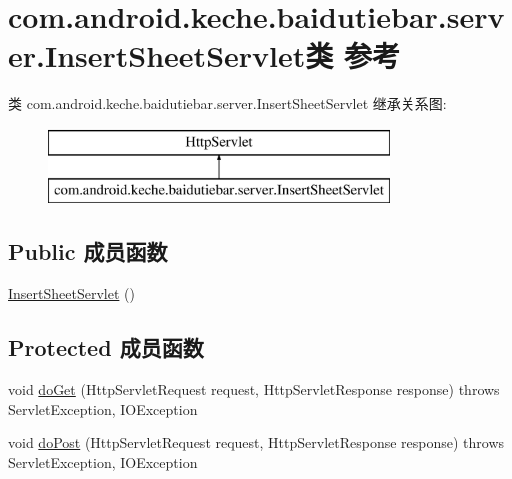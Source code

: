 \hypertarget{classcom_1_1android_1_1keche_1_1baidutiebar_1_1server_1_1_insert_sheet_servlet}{}\section{com.\+android.\+keche.\+baidutiebar.\+server.\+Insert\+Sheet\+Servlet类 参考}
\label{classcom_1_1android_1_1keche_1_1baidutiebar_1_1server_1_1_insert_sheet_servlet}
类 com.\+android.\+keche.\+baidutiebar.\+server.\+Insert\+Sheet\+Servlet 继承关系图\+:\begin{figure}[H]
\begin{center}
\leavevmode
\includegraphics[height=2.000000cm]{classcom_1_1android_1_1keche_1_1baidutiebar_1_1server_1_1_insert_sheet_servlet}
\end{center}
\end{figure}
\subsection*{Public 成员函数}
\begin{DoxyCompactItemize}
\item 
\mbox{\hyperlink{classcom_1_1android_1_1keche_1_1baidutiebar_1_1server_1_1_insert_sheet_servlet_a948ff760e2d129d00a6420a48411d1df}{Insert\+Sheet\+Servlet}} ()
\end{DoxyCompactItemize}
\subsection*{Protected 成员函数}
\begin{DoxyCompactItemize}
\item 
void \mbox{\hyperlink{classcom_1_1android_1_1keche_1_1baidutiebar_1_1server_1_1_insert_sheet_servlet_a1719bd6108ece268a5bc4ae2f99ba696}{do\+Get}} (Http\+Servlet\+Request request, Http\+Servlet\+Response response)  throws Servlet\+Exception, I\+O\+Exception 
\item 
void \mbox{\hyperlink{classcom_1_1android_1_1keche_1_1baidutiebar_1_1server_1_1_insert_sheet_servlet_afda7ec1d201f7ace619c57faa3e36a8e}{do\+Post}} (Http\+Servlet\+Request request, Http\+Servlet\+Response response)  throws Servlet\+Exception, I\+O\+Exception 
\end{DoxyCompactItemize}


